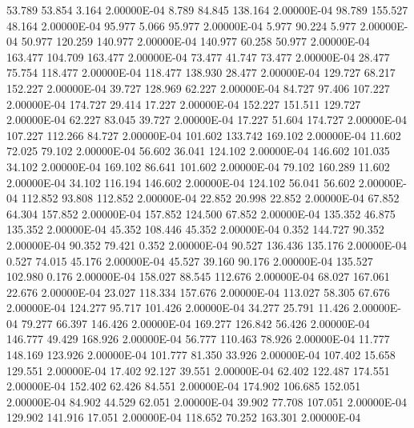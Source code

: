    53.789    53.854     3.164  2.00000E-04
     8.789    84.845   138.164  2.00000E-04
    98.789   155.527    48.164  2.00000E-04
    95.977     5.066    95.977  2.00000E-04
     5.977    90.224     5.977  2.00000E-04
    50.977   120.259   140.977  2.00000E-04
   140.977    60.258    50.977  2.00000E-04
   163.477   104.709   163.477  2.00000E-04
    73.477    41.747    73.477  2.00000E-04
    28.477    75.754   118.477  2.00000E-04
   118.477   138.930    28.477  2.00000E-04
   129.727    68.217   152.227  2.00000E-04
    39.727   128.969    62.227  2.00000E-04
    84.727    97.406   107.227  2.00000E-04
   174.727    29.414    17.227  2.00000E-04
   152.227   151.511   129.727  2.00000E-04
    62.227    83.045    39.727  2.00000E-04
    17.227    51.604   174.727  2.00000E-04
   107.227   112.266    84.727  2.00000E-04
   101.602   133.742   169.102  2.00000E-04
    11.602    72.025    79.102  2.00000E-04
    56.602    36.041   124.102  2.00000E-04
   146.602   101.035    34.102  2.00000E-04
   169.102    86.641   101.602  2.00000E-04
    79.102   160.289    11.602  2.00000E-04
    34.102   116.194   146.602  2.00000E-04
   124.102    56.041    56.602  2.00000E-04
   112.852    93.808   112.852  2.00000E-04
    22.852    20.998    22.852  2.00000E-04
    67.852    64.304   157.852  2.00000E-04
   157.852   124.500    67.852  2.00000E-04
   135.352    46.875   135.352  2.00000E-04
    45.352   108.446    45.352  2.00000E-04
     0.352   144.727    90.352  2.00000E-04
    90.352    79.421     0.352  2.00000E-04
    90.527   136.436   135.176  2.00000E-04
     0.527    74.015    45.176  2.00000E-04
    45.527    39.160    90.176  2.00000E-04
   135.527   102.980     0.176  2.00000E-04
   158.027    88.545   112.676  2.00000E-04
    68.027   167.061    22.676  2.00000E-04
    23.027   118.334   157.676  2.00000E-04
   113.027    58.305    67.676  2.00000E-04
   124.277    95.717   101.426  2.00000E-04
    34.277    25.791    11.426  2.00000E-04
    79.277    66.397   146.426  2.00000E-04
   169.277   126.842    56.426  2.00000E-04
   146.777    49.429   168.926  2.00000E-04
    56.777   110.463    78.926  2.00000E-04
    11.777   148.169   123.926  2.00000E-04
   101.777    81.350    33.926  2.00000E-04
   107.402    15.658   129.551  2.00000E-04
    17.402    92.127    39.551  2.00000E-04
    62.402   122.487   174.551  2.00000E-04
   152.402    62.426    84.551  2.00000E-04
   174.902   106.685   152.051  2.00000E-04
    84.902    44.529    62.051  2.00000E-04
    39.902    77.708   107.051  2.00000E-04
   129.902   141.916    17.051  2.00000E-04
   118.652    70.252   163.301  2.00000E-04
